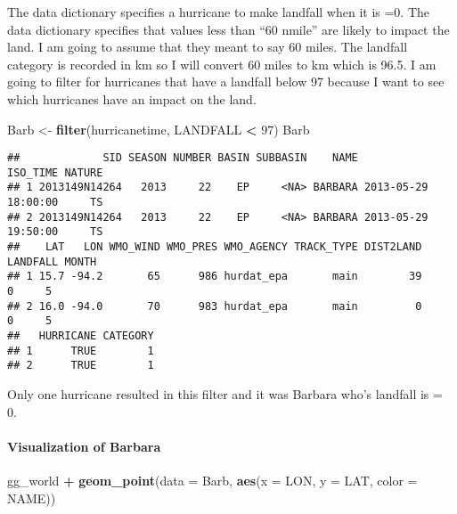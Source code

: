 \documentclass[
]{article}
\newenvironment{Shaded}{\begin{snugshade}}{\end{snugshade}}
\newcommand{\DataTypeTok}[1]{\textcolor[rgb]{0.13,0.29,0.53}{#1}}
\newcommand{\DecValTok}[1]{\textcolor[rgb]{0.00,0.00,0.81}{#1}}
\newcommand{\KeywordTok}[1]{\textcolor[rgb]{0.13,0.29,0.53}{\textbf{#1}}}
\newcommand{\NormalTok}[1]{#1}
\newcommand{\OperatorTok}[1]{\textcolor[rgb]{0.81,0.36,0.00}{\textbf{#1}}}
\newcommand{\StringTok}[1]{\textcolor[rgb]{0.31,0.60,0.02}{#1}}
\begin{document}
The data dictionary specifies a hurricane to make landfall when it is
=0. The data dictionary specifies that values less than ``60 nmile'' are
likely to impact the land. I am going to assume that they meant to say
60 miles. The landfall category is recorded in km so I will convert 60
miles to km which is 96.5. I am going to filter for hurricanes that have
a landfall below 97 because I want to see which hurricanes have an
impact on the land.

\begin{Shaded}
\begin{Highlighting}[]
\NormalTok{Barb <-}\StringTok{ }\KeywordTok{filter}\NormalTok{(hurricanetime, LANDFALL }\OperatorTok{<}\StringTok{ }\DecValTok{97}\NormalTok{)}
\NormalTok{Barb}
\end{Highlighting}
\end{Shaded}

\begin{verbatim}
##             SID SEASON NUMBER BASIN SUBBASIN    NAME            ISO_TIME NATURE
## 1 2013149N14264   2013     22    EP     <NA> BARBARA 2013-05-29 18:00:00     TS
## 2 2013149N14264   2013     22    EP     <NA> BARBARA 2013-05-29 19:50:00     TS
##    LAT   LON WMO_WIND WMO_PRES WMO_AGENCY TRACK_TYPE DIST2LAND LANDFALL MONTH
## 1 15.7 -94.2       65      986 hurdat_epa       main        39        0     5
## 2 16.0 -94.0       70      983 hurdat_epa       main         0        0     5
##   HURRICANE CATEGORY
## 1      TRUE        1
## 2      TRUE        1
\end{verbatim}

Only one hurricane resulted in this filter and it was Barbara who's
landfall is = 0.

\hypertarget{visualization-of-barbara}{%
\paragraph{Visualization of Barbara}\label{visualization-of-barbara}}

\begin{Shaded}
\begin{Highlighting}[]
\NormalTok{gg_world }\OperatorTok{+}\StringTok{ }
\StringTok{  }\KeywordTok{geom_point}\NormalTok{(}\DataTypeTok{data =}\NormalTok{ Barb, }\KeywordTok{aes}\NormalTok{(}\DataTypeTok{x =}\NormalTok{ LON, }\DataTypeTok{y =}\NormalTok{ LAT, }\DataTypeTok{color =}\NormalTok{ NAME))}
\end{Highlighting}
\end{Shaded}
\end{document}
